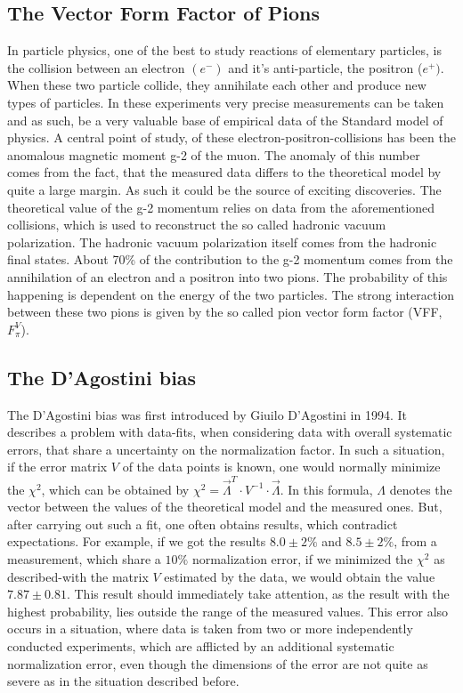 \documentclass[a4paper]{article}
\begin{document}
\subsection{The Vector Form Factor of Pions}
In particle physics, one of the best to study reactions of elementary particles, is
the collision between an electron $(e^-)$ and it's anti-particle, the positron ($e^+)$. When these
two particle collide, they annihilate each other and produce new types of particles. In
these experiments very precise measurements can be taken and as such, be a very valuable base
of empirical data of the Standard model of physics. A central point of study, of these
electron-positron-collisions has been the anomalous magnetic moment g-2 of the muon.
The anomaly of this number comes from the fact, that the measured data differs to the
theoretical model by quite a large margin. As such it could be the source of exciting discoveries.
The theoretical value of the g-2 momentum relies on data from the aforementioned collisions,
which is used to reconstruct the so called hadronic vacuum polarization. The hadronic vacuum
polarization itself comes from the hadronic final states. About 70\% of the contribution to
the g-2 momentum comes from the annihilation of an electron and a positron into two pions.
The probability of this happening is dependent on the energy of the two particles.
The strong interaction between these two pions is given by the so called pion vector
form factor (VFF, $F_\pi^V$).
\subsection{The D'Agostini bias}
The D'Agostini bias was first introduced by Giuilo D'Agostini in 1994. It describes a problem
with data-fits, when considering data with overall systematic errors, that share a uncertainty
on the normalization factor. In such a situation, if the error matrix $V$ of the data points is
known, one would normally minimize the $\chi^2$, which can be obtained by
$\chi^2=\vec{\Lambda}^T\cdot V^{-1}\cdot\vec{\Lambda}$. In this formula, $\Lambda$ denotes the vector
between the values of the theoretical model and the measured ones. But, after carrying out such a fit, one
often obtains results, which contradict expectations. For example, if we got the results $8.0\pm 2\%$
and $8.5\pm 2\%$, from a measurement, which share a $10\%$ normalization error, if
we minimized the $\chi^2$ as described-with the matrix $V$ estimated by the data, we would obtain the value
$7.87\pm 0.81$. This result should immediately take attention, as the result with the
highest probability, lies outside the range of the measured values. This error also occurs in
a situation, where data is taken from two or more independently conducted experiments, which are afflicted
by an additional systematic normalization error, even though the dimensions of the error are
not quite as severe as in the situation described before.
\end{document}
